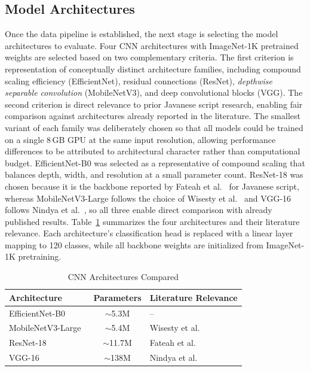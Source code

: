 \documentclass[conference]{IEEEtran}
\begin{document}
\subsection{Model Architectures}

Once the data pipeline is established, the next stage is selecting
the model architectures to evaluate.
Four CNN architectures with ImageNet-1K pretrained weights are
selected based on two complementary criteria.
The first criterion is representation of conceptually distinct
architecture families, including compound scaling efficiency (EfficientNet),
residual connections (ResNet), \textit{depthwise separable
convolution} (MobileNetV3), and deep convolutional blocks (VGG).
The second criterion is direct relevance to prior Javanese script
research, enabling fair comparison against architectures already
reported in the literature.
The smallest variant of each family was deliberately chosen so that
all models could be trained on a single 8\,GB GPU at the same input
resolution, allowing performance differences to be attributed to
architectural character rather than computational budget.
EfficientNet-B0 was selected as a representative of compound scaling
that balances depth, width, and resolution at a small parameter count.
ResNet-18 was chosen because it is the backbone reported by Fateah et
al.~\cite{ifriza2026} for Javanese script, whereas MobileNetV3-Large
follows the choice of Wisesty et al.~\cite{wisesty2026} and VGG-16
follows Nindya et al.~\cite{nindya2025}, so all three enable direct
comparison with already published results.
Table~\ref{tab:arch} summarizes the four architectures and their
literature relevance.
Each architecture's classification head is replaced with a linear
layer mapping to 120 classes, while all backbone weights are
initialized from ImageNet-1K pretraining.

\begin{table}[t]
\caption{CNN Architectures Compared}
\label{tab:arch}
\begin{center}
\renewcommand{\arraystretch}{1.2}
\begin{tabular}{lcl}
\toprule
\textbf{Architecture} & \textbf{Parameters} & \textbf{Literature Relevance} \\
\midrule
EfficientNet-B0~\cite{tan2019efficientnet}    & $\sim$5.3M  & -- \\
MobileNetV3-Large~\cite{howard2019mobilenetv3}& $\sim$5.4M  & Wisesty et al.~\cite{wisesty2026} \\
ResNet-18~\cite{he2016resnet}                 & $\sim$11.7M & Fateah et al.~\cite{ifriza2026} \\
VGG-16~\cite{simonyan2015vgg}                 & $\sim$138M  & Nindya et al.~\cite{nindya2025} \\
\bottomrule
\end{tabular}
\end{center}
\end{table}
\end{document}
